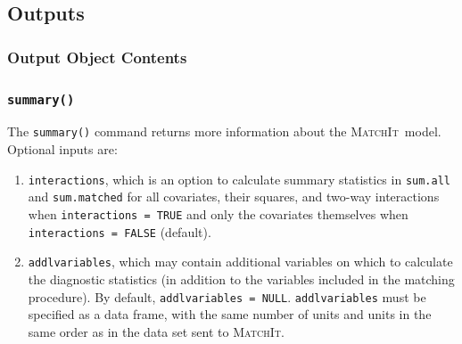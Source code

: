 \documentclass[oneside,letterpaper,titlepage]{article}
\newcommand{\MatchIt}{\textsc{MatchIt}}
\begin{document}

\subsection{Outputs}
\label{subsec:outputs}

\subsubsection{Output Object Contents}



\subsubsection{{\tt summary()}}
The \texttt{summary()} command returns more information about the
\MatchIt\ model.  Optional inputs are:

\begin{enumerate}
\item \texttt{interactions}, which is an option to calculate summary
  statistics in \texttt{sum.all} and \texttt{sum.matched} for all
  covariates, their squares, and two-way interactions when
  \texttt{interactions = TRUE} and only the covariates themselves when
  \texttt{interactions = FALSE} (default).
\item \texttt{addlvariables}, which may contain additional variables
  on which to calculate the diagnostic statistics (in addition to the
  variables included in the matching procedure).  By default,
  \texttt{addlvariables = NULL}.  \texttt{addlvariables} must be
  specified as a data frame, with the same number of units and units
  in the same order as in the data set sent to \MatchIt .
\end{enumerate}
\end{document}
